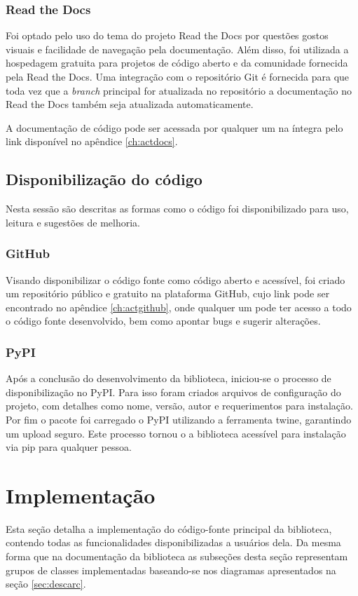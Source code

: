 \subsubsection{Read the Docs}

Foi optado pelo uso do tema do projeto Read the Docs por questões gostos visuais e facilidade de navegação pela
documentação.
Além disso, foi utilizada a hospedagem gratuita para projetos de código aberto e da comunidade fornecida pela Read the
Docs.
Uma integração com o repositório Git é fornecida para que toda vez que a \textit{branch} principal for atualizada no repositório
a documentação no Read the Docs também seja atualizada automaticamente.

A documentação de código pode ser acessada por qualquer um na íntegra pelo link disponível no apêndice \ref{ch:actdocs}.

\subsection{Disponibilização do código}

Nesta sessão são descritas as formas como o código foi disponibilizado para uso, leitura e sugestões de melhoria.

\subsubsection{GitHub}

Visando disponibilizar o código fonte como código aberto e acessível, foi criado um repositório público e gratuito na
plataforma GitHub, cujo link pode ser encontrado no apêndice \ref{ch:actgithub}, onde qualquer um pode ter acesso a todo
o código fonte desenvolvido, bem como apontar bugs e sugerir alterações.

\subsubsection{PyPI}

Após a conclusão do desenvolvimento da biblioteca, iniciou-se o processo de disponibilização no PyPI\@.
Para isso foram criados arquivos de configuração do projeto, com detalhes como nome, versão, autor e requerimentos
para instalação.
Por fim o pacote foi carregado o PyPI utilizando a ferramenta twine, garantindo um upload seguro.
Este processo tornou o a biblioteca acessível para instalação via pip para qualquer pessoa.

\section{Implementação}\label{sec:imp}
Esta seção detalha a implementação do código-fonte principal da biblioteca, contendo todas as funcionalidades
disponibilizadas a usuários dela.
Da mesma forma que na documentação da biblioteca as subseções desta seção representam grupos de classes implementadas
baseando-se nos diagramas apresentados na seção \ref{sec:descarc}.

